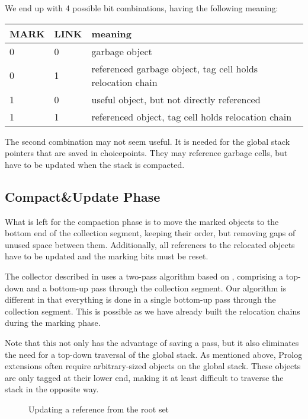 We end up with 4 possible bit combinations, having the following meaning:

\begin{center}
\begin{tabular}{|l|l|l|} \hline
MARK&LINK&meaning \\ \hline
0 & 0 & garbage object \\
0 & 1 & referenced garbage object, tag cell holds relocation
chain\\
1 & 0 & useful object, but not directly referenced \\
1 & 1 & referenced object, tag cell holds relocation chain \\ \hline
\end{tabular}
\end{center}
The second combination may not seem useful. It is needed for the
global stack pointers that are saved in choicepoints. They may
reference garbage cells, but have to be updated when the stack is compacted.
\subsection{Compact\&Update Phase}

What is left for the compaction phase is to move the marked objects
to the
bottom end of the collection segment, keeping their order, but removing
gaps of unused space between them.
Additionally, all references to the relocated objects have to be
updated and the marking bits must be reset.

The collector described in \cite{achs} uses a
two-pass algorithm based on \cite{morris}, comprising a top-down
and a bottom-up pass through the collection segment.
Our algorithm is different in that everything is done in a single
bottom-up pass through the collection segment.
This is possible as we have already built the relocation chains
during the marking phase.

Note that this not only has the advantage of saving a pass, but it
also eliminates the need for a top-down traversal of the global stack.
As mentioned above, Prolog extensions often require arbitrary-sized
objects on the global stack.
These objects are only tagged at their lower end, making
it at least difficult to traverse the stack in the opposite way.
\begin{figure}
\caption{Updating a reference from the root set}
\label{compactref}
\end{figure}

